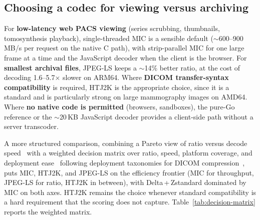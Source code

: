 \documentclass[journal]{IEEEtran}
\begin{document}
\subsection{Choosing a codec for viewing versus archiving}

For \textbf{low-latency web PACS viewing} (series scrubbing, thumbnails,
tomosynthesis playback), single-threaded MIC is a sensible default
(${\sim}$600--900\,MB/s per request on the native C path), with strip-parallel
MIC for one large frame at a time and the JavaScript decoder when the client is
the browser. For \textbf{smallest archival files}, JPEG-LS keeps a ${\sim}$14\%
better ratio, at the cost of decoding 1.6--5.7$\times$ slower on ARM64. Where
\textbf{DICOM transfer-syntax compatibility} is required, HTJ2K is the
appropriate choice, since it is a standard and is particularly strong on large
mammography images on AMD64. Where \textbf{no native code is permitted}
(browsers, sandboxes), the pure-Go reference or the ${\sim}$20\,KB JavaScript
decoder provides a client-side path without a server transcoder.

A more structured comparison, combining a Pareto view of ratio versus decode
speed~\cite{geldreich_pareto,jpegxl_pareto} with a weighted decision matrix over
ratio, speed, platform coverage, and deployment ease~\cite{saaty_ahp,sayood}
following deployment taxonomies for DICOM
compression~\cite{clunie_miit2009,liu2017}, puts MIC, HTJ2K, and JPEG-LS on the
efficiency frontier (MIC for throughput, JPEG-LS for ratio, HTJ2K in between),
with Delta\,+\,Zstandard dominated by MIC on both axes. HTJ2K remains the choice
whenever standard compatibility is a hard requirement that the scoring does not
capture. Table~\ref{tab:decision-matrix} reports the weighted matrix.
\end{document}
